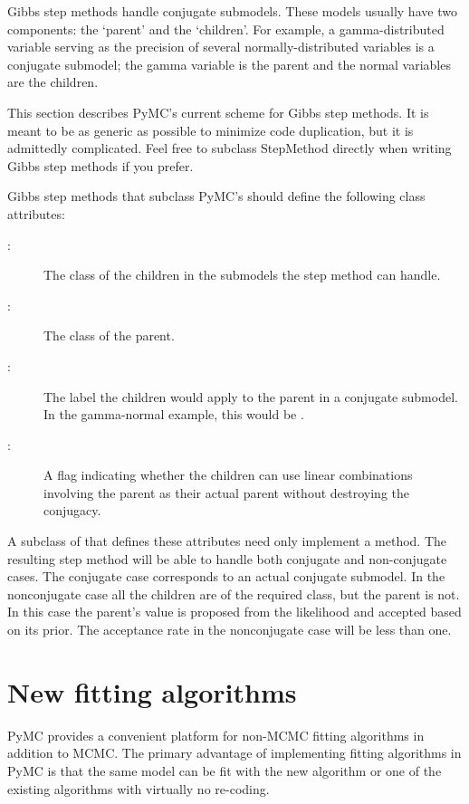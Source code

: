 Gibbs step methods handle conjugate submodels. These models usually have two components: the `parent' and the `children'. For example, a gamma-distributed variable serving as the precision of several normally-distributed variables is a conjugate submodel; the gamma variable is the parent and the normal variables are the children. 

This section describes PyMC's current scheme for Gibbs step methods. It is meant to be as generic as possible to minimize code duplication, but it is admittedly complicated. Feel free to subclass StepMethod directly when writing Gibbs step methods if you prefer.

Gibbs step methods that subclass PyMC's  should define the following class attributes:
\begin{description}
   \item[:] The class of the children in the submodels the step method can handle.
   \item[:] The class of the parent.
   \item[:] The label the children would apply to the parent in a conjugate submodel. In the gamma-normal example, this would be .
   \item[:] A flag indicating whether the children can use linear combinations involving the parent as their actual parent without destroying the conjugacy.
\end{description}

A subclass of  that defines these attributes need only implement a  method. The resulting step method will be able to handle both conjugate and non-conjugate cases. The conjugate case corresponds to an actual conjugate submodel. In the nonconjugate case all the children are of the required class, but the parent is not. In this case the parent's value is proposed from the likelihood and accepted based on its prior. The acceptance rate in the nonconjugate case will be less than one.

\hypertarget{custom-model}{}
\section*{New fitting algorithms} \label{custom-model}

PyMC provides a convenient platform for non-MCMC fitting algorithms in addition to MCMC. The primary advantage of implementing fitting algorithms in PyMC is that the same model can be fit with the new algorithm or one of the existing algorithms with virtually no re-coding.

